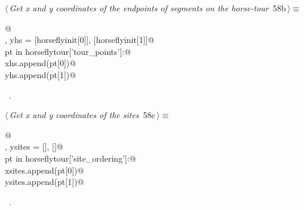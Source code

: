 \documentclass[11.5pt]{report}
\begin{document}
\vspace{-0.8cm} \newchunk
\begin{flushleft} \small
\begin{minipage}{\linewidth}\label{scrap84}\raggedright\small
{} $\langle\,${\itshape Get x and y coordinates of the endpoints of segments on the horse-tour}\nobreak\ {\footnotesize {58b}}$\,\rangle\equiv$
\vspace{-1ex}
\begin{list}{}{} \item
\mbox{}\verb@   @\\
\mbox{}\verb@xhs, yhs = [horseflyinit[0]], [horseflyinit[1]]@\\
\mbox{}\verb@for pt in horseflytour['tour_points']:@\\
\mbox{}\verb@    xhs.append(pt[0])@\\
\mbox{}\verb@    yhs.append(pt[1])@\\
\mbox{}\verb@@{\NWsep}
\end{list}
\vspace{-1.5ex}
\footnotesize
\begin{list}{}{\setlength{\itemsep}{-\parsep}\setlength{\itemindent}{-\leftmargin}}
\item \NWtxtMacroRefIn\ .

\item{}
\end{list}
\end{minipage}\vspace{4ex}
\end{flushleft}

\vspace{-0.8cm} \newchunk
\begin{flushleft} \small
\begin{minipage}{\linewidth}\label{scrap85}\raggedright\small
{} $\langle\,${\itshape Get x and y coordinates of the sites}\nobreak\ {\footnotesize {58c}}$\,\rangle\equiv$
\vspace{-1ex}
\begin{list}{}{} \item
\mbox{}\verb@   @\\
\mbox{}\verb@xsites, ysites = [], []@\\
\mbox{}\verb@for pt in horseflytour['site_ordering']:@\\
\mbox{}\verb@    xsites.append(pt[0])@\\
\mbox{}\verb@    ysites.append(pt[1])@\\
\mbox{}\verb@@{\NWsep}
\end{list}
\vspace{-1.5ex}
\footnotesize
\begin{list}{}{\setlength{\itemsep}{-\parsep}\setlength{\itemindent}{-\leftmargin}}
\item \NWtxtMacroRefIn\ .

\item{}
\end{list}
\end{minipage}\vspace{4ex}
\end{flushleft}
\end{document}

